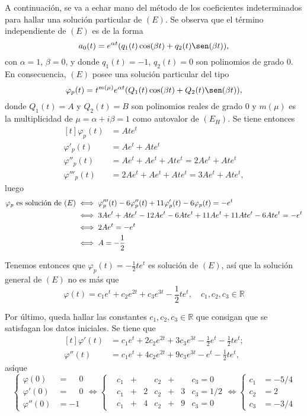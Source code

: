 \documentclass[11pt]{report}
\newcommand{\R}{\mathbb R}
\begin{document}
A continuación, se va a echar mano del método de los coeficientes indeterminados para hallar una solución particular de $(E)$. Se observa que el término independiente de $(E)$ es de la forma 
\[a_0(t)=e^{\alpha t}(q_1(t)\cos(\beta t)+q_2(t)\sen(\beta t)),\] con $\alpha=1$, $\beta=0$, y donde $q_1(t)=-1$, $q_2(t)=0$ son polinomios de grado 0. En consecuencia, $(E)$ posee una solución particular del tipo
\[\varphi_p(t)=t^{m(\mu)}e^{\alpha t}(Q_1(t)\cos(\beta t)+Q_2(t)\sen(\beta t)),\]
donde $Q_1(t)=A$ y $Q_2(t)=B$ son polinomios reales de grado $0$ y $m(\mu)$ es la multiplicidad de $\mu=\alpha+i\beta = 1$ como autovalor de $(E_H)$. Se tiene entonces
\[\begin{aligned}[t]
    \varphi_p(t)&=Ate^{t} \\
    \varphi'_p(t)&=Ae^{t}+Ate^t \\
    \varphi''_p(t)&=Ae^t+Ae^t+Ate^t=2Ae^t+Ate^t \\
    \varphi'''_p(t)&=2Ae^t+Ae^t+Ate^t=3Ae^t+Ate^t,
\end{aligned}\] luego
\[
\begin{aligned}[t]
    \varphi_p \textup{ es solución de } (E) &\iff \varphi_p'''(t)-6\varphi_p''(t)+11\varphi_p'(t)-6\varphi_p(t)=-e^t \\
    &\iff 3Ae^t+Ate^t-12Ae^t-6Ate^t+11Ae^t+11Ate^t-6Ate^t=-e^t \\
    &\iff 2Ae^t =-e^t \\
    &\iff A=-\frac{1}{2}
\end{aligned}
\]

Tenemos entonces que $\varphi_p(t)=-\frac{1}{2}te^t$ es solución de $(E)$, así que la solución general de $(E)$ no es más que
\[\varphi(t)=c_1e^t+c_2e^{2t}+c_3e^{3t}-\frac{1}{2}te^t, \quad c_1,c_2,c_3 \in \R\]

Por último, queda hallar las constantes $c_1,c_2,c_3 \in \R$ que consigan que se satisfagan los datos iniciales. Se tiene que
\[
\begin{aligned}[t]
    \varphi'(t)&=c_1e^t+2c_2e^{2t}+3c_3e^{3t}-\frac{1}{2}e^t-\frac{1}{2}te^t; \\
    \varphi''(t)&= c_1e^t+4c_2e^{2t}+9c_3e^{3t}-e^t-\frac{1}{2}te^t,
\end{aligned}
\]
asíque
\[\left\{\begin{alignedat}{1}
    \varphi(0) &=\phantom{-}0 \\
    \varphi'(0) &=\phantom{-}0 \\
    \varphi''(0)&=-1
\end{alignedat} \right.\iff \left\{\begin{alignedat}{8}
    &c_1 & {}+{} &  &c_2 & {}+{} &  &c_3 = 0 \\
    &c_1 & {}+{} & 2&c_2 & {}+{} & 3&c_3 = 1/2 \\
    &c_1 & {}+{} & 4&c_2 & {}+{} & 9&c_3 = 0
\end{alignedat}\right. \iff
\left\{\begin{alignedat}{8}
    c_1 & = -5/4\\
    c_2 & =  2 \\
    c_3 & = -3/4
\end{alignedat}\right.\]
\end{document}
